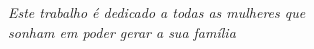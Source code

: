 \begin{dedicatoria}
   \vspace*{\fill}
   \centering
   \noindent

   \textit{Este trabalho é dedicado a todas as mulheres que\\
   sonham em poder gerar a sua família} \vspace*{\fill}
\end{dedicatoria}
